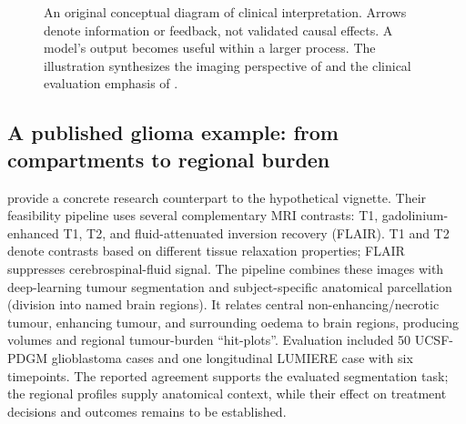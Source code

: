 \documentclass[11pt,a4paper]{article}
\begin{document}
\begin{figure}[htbp]
\centering
{}
\caption{An original conceptual diagram of clinical interpretation. Arrows denote information or feedback, not validated causal effects. A model's output becomes useful within a larger process. The illustration synthesizes the imaging perspective of \citet{lundervold2019} and the clinical evaluation emphasis of \citet{decide2022}.}
\label{fig:pathway}
\end{figure}

\subsection{A published glioma example: from compartments to regional burden}
\citet{lundervold2026glioma} provide a concrete research counterpart to the hypothetical vignette. Their feasibility pipeline uses several complementary MRI contrasts: T1, gadolinium-enhanced T1, T2, and fluid-attenuated inversion recovery (FLAIR). T1 and T2 denote contrasts based on different tissue relaxation properties; FLAIR suppresses cerebrospinal-fluid signal. The pipeline combines these images with deep-learning tumour segmentation and subject-specific anatomical parcellation (division into named brain regions). It relates central non-enhancing/necrotic tumour, enhancing tumour, and surrounding oedema to brain regions, producing volumes and regional tumour-burden ``hit-plots''. Evaluation included 50 UCSF-PDGM glioblastoma cases and one longitudinal LUMIERE case with six timepoints. The reported agreement supports the evaluated segmentation task; the regional profiles supply anatomical context, while their effect on treatment decisions and outcomes remains to be established.
\end{document}
